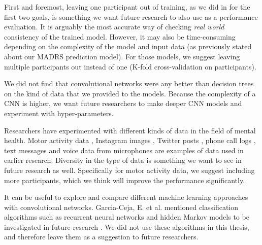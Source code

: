 First and foremost, leaving one participant out of training, as we did in for the first two goals, is something we want future research to also use as a performance evaluation. It is arguably the most accurate way of checking \textit{real world} consistency of the trained model. However, it may also be time-consuming depending on the complexity of the model and input data (as previously stated about our MADRS prediction model). For those models, we suggest leaving multiple participants out instead of one (K-fold cross-validation on participants).

We did not find that convolutional networks were any better than decision trees on the kind of data that we provided to the models. Because the complexity of a CNN is higher, we want future researchers to make deeper CNN models and experiment with hyper-parameters. 

Researchers have experimented with different kinds of data in the field of mental health. Motor activity data \cite{obrien_depression, GarciaCeja2018_classification_bipolar}, Instagram images \cite{instagram_depression}, Twitter posts \cite{twitter_depression}, phone call logs \cite{faurholt_smartphone_bipolar, grunerbl_smartphone_bipolar}, text messages and voice data from microphones \cite{grunerbl_smartphone_bipolar} are examples of data used in earlier research. Diversity in the type of data is something we want to see in future research as well. Specifically for motor activity data, we suggest including more participants, which we think will improve the performance significantly.

It can be useful to explore and compare different machine learning approaches with convolutional networks. Garcia-Ceja, E. et al. mentioned classification algorithms such as recurrent neural networks and hidden Markov models to be investigated in future research \cite{GarciaCeja2018_classification_bipolar}. We did not use these algorithms in this thesis, and therefore leave them as a suggestion to future researchers. 